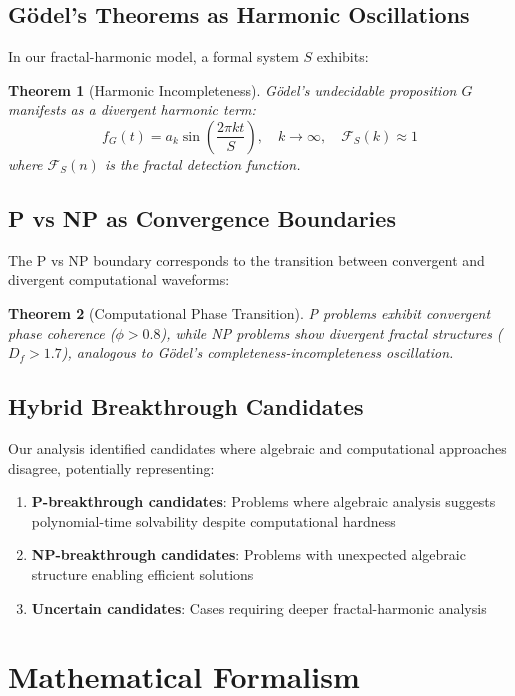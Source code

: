 \documentclass[12pt]{article}
\newtheorem{theorem}{Theorem}
\begin{document}
\subsection{Gödel's Theorems as Harmonic Oscillations}

In our fractal-harmonic model, a formal system \( S \) exhibits:

\begin{theorem}[Harmonic Incompleteness]
Gödel's undecidable proposition \( G \) manifests as a divergent harmonic term:
\[
f_G(t) = a_k \sin\left(\frac{2\pi k t}{S}\right), \quad k \to \infty, \quad \mathcal{F}_S(k) \approx 1
\]
where \( \mathcal{F}_S(n) \) is the fractal detection function.
\end{theorem}

\subsection{P vs NP as Convergence Boundaries}

The P vs NP boundary corresponds to the transition between convergent and divergent computational waveforms:

\begin{theorem}[Computational Phase Transition]
P problems exhibit convergent phase coherence (\( \phi > 0.8 \)), while NP problems show divergent fractal structures (\( D_f > 1.7 \)), analogous to Gödel's completeness-incompleteness oscillation.
\end{theorem}

\subsection{Hybrid Breakthrough Candidates}

Our analysis identified candidates where algebraic and computational approaches disagree, potentially representing:
\begin{enumerate}
    \item \textbf{P-breakthrough candidates}: Problems where algebraic analysis suggests polynomial-time solvability despite computational hardness
    \item \textbf{NP-breakthrough candidates}: Problems with unexpected algebraic structure enabling efficient solutions
    \item \textbf{Uncertain candidates}: Cases requiring deeper fractal-harmonic analysis
\end{enumerate}

\section{Mathematical Formalism}
\end{document}
